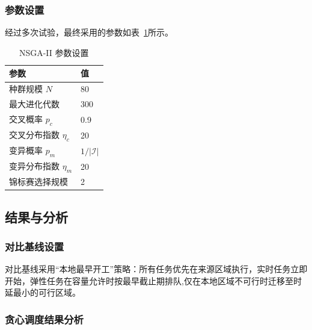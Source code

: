 \documentclass[UTF8,a4paper,zihao=-4]{ctexart}
\begin{document}
\subsubsection{参数设置}

经过多次试验，最终采用的参数如表~\ref{tab:params}所示。

\begin{table}[H]
\centering
\small
\caption{NSGA-II 参数设置}
\label{tab:params}
\begin{tabular}{ll}
\toprule
参数 & 值 \\
\midrule
种群规模 $N$ & 80 \\
最大进化代数 & 300 \\
交叉概率 $p_c$ & 0.9 \\
交叉分布指数 $\eta_c$ & 20 \\
变异概率 $p_m$ & $1/|\mathcal{I}|$ \\
变异分布指数 $\eta_m$ & 20 \\
锦标赛选择规模 & 2 \\
\bottomrule
\end{tabular}
\end{table}

\subsection{结果与分析}

\subsubsection{对比基线设置}



对比基线采用“本地最早开工”策略：所有任务优先在来源区域执行，实时任务立即开始，弹性任务在容量允许时按最早截止期排队,仅在本地区域不可行时迁移至时延最小的可行区域。



\subsubsection{贪心调度结果分析}
\end{document}
